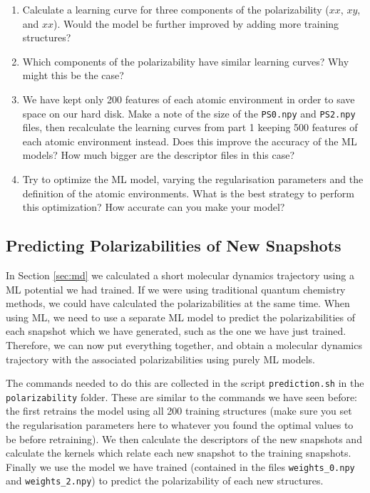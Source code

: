 \documentclass{article}
\begin{document}
\begin{enumerate}

\item Calculate a learning curve for three components of the polarizability ($xx$, $xy$, and $xx$). Would the model be further improved by adding more training structures?
\item Which components of the polarizability have similar learning curves? Why might this be the case?
\item We have kept only 200 features of each atomic environment in order to save space on our hard disk. Make a note of the size of the \verb|PS0.npy| and \verb|PS2.npy| files, then recalculate the learning curves from part 1 keeping 500 features of each atomic environment instead. Does this improve the accuracy of the ML models? How much bigger are the descriptor files in this case?
\item Try to optimize the ML model, varying the regularisation parameters and the definition of the atomic environments. What is the best strategy to perform this optimization? How accurate can you make your model?

\end{enumerate}

\subsection*{Predicting Polarizabilities of New Snapshots}

In Section \ref{sec:md} we calculated a short molecular dynamics trajectory using a ML potential we had trained. If we were using traditional quantum chemistry methods, we could have calculated the polarizabilities at the same time. When using ML, we need to use a separate ML model to predict the polarizabilities of each snapshot which we have generated, such as the one we have just trained. Therefore, we can now put everything together, and obtain a molecular dynamics trajectory with the associated polarizabilities using purely ML models.

The commands needed to do this are collected in the script \verb|prediction.sh| in the \verb|polarizability| folder. These are similar to the commands we have seen before: the first retrains the model using all 200 training structures (make sure you set the regularisation parameters here to whatever you found the optimal values to be before retraining). We then calculate the descriptors of the new snapshots and calculate the kernels which relate each new snapshot to the training snapshots. Finally we use the model we have trained (contained in the files \verb|weights_0.npy| and \verb|weights_2.npy|) to predict the polarizability of each new structures.
\end{document}
